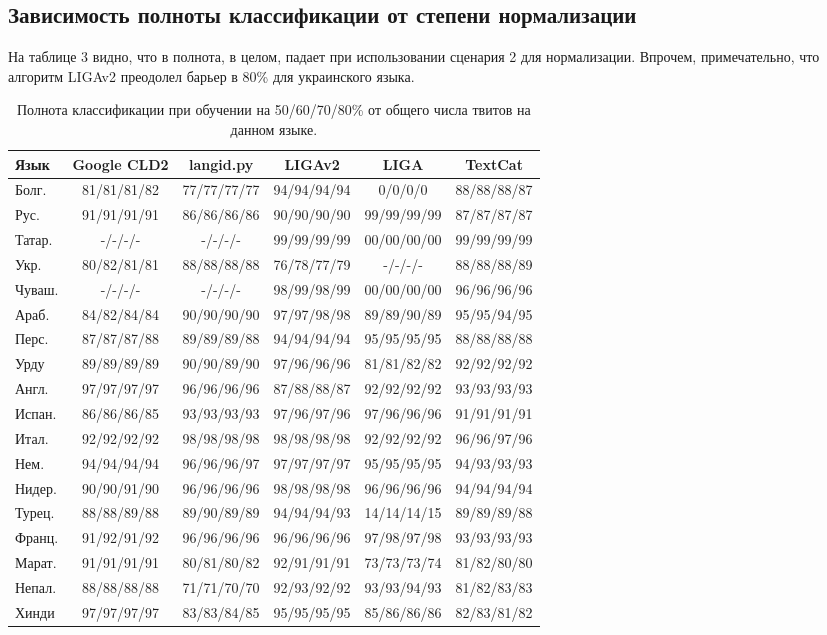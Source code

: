 \documentclass[a4paper, 14pt]{article}
\begin{document}
		\subsection{Зависимость полноты классификации от степени нормализации}
		На таблице 3 видно, что в полнота, в целом, падает при использовании сценария 2 для нормализации. Впрочем, 
		примечательно, что алгоритм LIGAv2 преодолел барьер в 80\% для украинского языка.
\begin{center}
\begin{table}
\begin{tabular*}{1.07\textwidth}{| l| *{5}{|c} |}
\hline 
Язык & Google CLD2 & langid.py & LIGAv2 & LIGA & TextCat \\
\hline
\hline
Болг. & 81/81/81/82 & 77/77/77/77 & 94/94/94/94 & 0/0/0/0 & 88/88/88/87 \\
Рус. & 91/91/91/91 & 86/86/86/86 & 90/90/90/90 & 99/99/99/99 & 87/87/87/87 \\
Татар. & -/-/-/- & -/-/-/- & 99/99/99/99 & 00/00/00/00 & 99/99/99/99 \\
Укр. & 80/82/81/81 & 88/88/88/88 & 76/78/77/79 & -/-/-/- & 88/88/88/89 \\
Чуваш. & -/-/-/- & -/-/-/- & 98/99/98/99 & 00/00/00/00 & 96/96/96/96 \\
\hline
\hline
Араб. & 84/82/84/84 & 90/90/90/90 & 97/97/98/98 & 89/89/90/89 & 95/95/94/95 \\
Перс. & 87/87/87/88 & 89/89/89/88 & 94/94/94/94 & 95/95/95/95 & 88/88/88/88 \\
Урду & 89/89/89/89 & 90/90/89/90 & 97/96/96/96 & 81/81/82/82 & 92/92/92/92 \\
\hline
\hline
Англ. & 97/97/97/97 & 96/96/96/96 & 87/88/88/87 & 92/92/92/92 & 93/93/93/93 \\
Испан. & 86/86/86/85 & 93/93/93/93 & 97/96/97/96 & 97/96/96/96 & 91/91/91/91 \\
Итал. & 92/92/92/92 & 98/98/98/98 & 98/98/98/98 & 92/92/92/92 & 96/96/97/96 \\
Нем. & 94/94/94/94 & 96/96/96/97 & 97/97/97/97 & 95/95/95/95 & 94/93/93/93 \\
Нидер. & 90/90/91/90 & 96/96/96/96 & 98/98/98/98 & 96/96/96/96 & 94/94/94/94 \\
Турец. & 88/88/89/88 & 89/90/89/89 & 94/94/94/93 & 14/14/14/15 & 89/89/89/88 \\
Франц. & 91/92/91/92 & 96/96/96/96 & 96/96/96/96 & 97/98/97/98 & 93/93/93/93 \\
\hline
\hline
Марат. & 91/91/91/91 & 80/81/80/82 & 92/91/91/91 & 73/73/73/74 & 81/82/80/80 \\
Непал. & 88/88/88/88 & 71/71/70/70 & 92/93/92/92 & 93/93/94/93 & 81/82/83/83 \\
Хинди & 97/97/97/97 & 83/83/84/85 & 95/95/95/95 & 85/86/86/86 & 82/83/81/82 \\
\hline
\end{tabular*}
\caption{Полнота классификации при обучении на 50/60/70/80\% от общего числа твитов на данном языке.}
\end{table}
\end{center}
\end{document}
